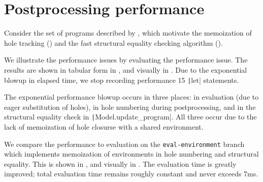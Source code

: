 \section{Postprocessing performance}
\label{sec:evaluation-renumbering}

Consider the set of programs described by , which motivate the memoization of hole tracking () and the fast structural equality checking algorithm ().

We illustrate the performance issues by evaluating the performance issue. The results are shown in tabular form in , and visually in . Due to the exponential blowup in elapsed time, we stop recording performance 15 \texttt|let| statements.

The exponential performance blowup occurs in three places: in evaluation (due to eager substitution of holes), in hole numbering during postprocessing, and in the structural equality check in \texttt|Model.update_program|. All three occur due to the lack of memoization of hole closurse with a shared environment.

We compare the performance to evaluation on the \texttt{eval-environment} branch which implements memoization of environments in hole numbering and structural equality. This is shown in , and visually in . The evaluation time is greatly improved; total evaluation time remains roughly constant and never exceeds 7ms.

